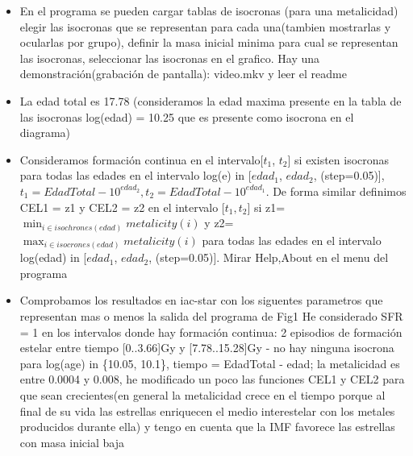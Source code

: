 \documentclass[10pt]{book}
\begin{document}
\begin{itemize}
\item En el programa se pueden cargar tablas de isocronas (para una metalicidad) elegir las isocronas que se representan para cada una(tambien mostrarlas y ocularlas por grupo), definir la masa inicial minima para cual se representan las isocronas, seleccionar las isocronas en el grafico. Hay una demonstración(grabación de pantalla): video.mkv y leer el readme
\item La edad total es 17.78 (consideramos la edad maxima presente en la tabla de las isocronas log(edad) = 10.25 que es presente como isocrona en el diagrama)
\item Consideramos formación continua en el intervalo[$t_1$, $t_2$]  si existen isocronas para todas las edades en el intervalo log(e) in [$edad_1$, $edad_2$,  (step=0.05)], $t_1=EdadTotal - 10^{edad_2}, t_2=EdadTotal - 10^{edad_1}$. De forma similar definimos CEL1 = z1 y CEL2 = z2 en el intervalo [$t_1, t_2$] si z1=$\displaystyle \min_{i \in isochrones(edad)} metalicity(i)$ y z2=$\displaystyle \max_{i \in isocrones(edad)} metalicity(i)$ para todas las edades  en el intervalo log(edad) in [$edad_1$, $edad_2$,  (step=0.05)]. Mirar Help,About en el menu del programa
\item Comprobamos los resultados en iac-star con los siguentes parametros que representan mas o menos la salida del programa de Fig1
He considerado SFR = 1 en los intervalos donde hay formación continua: 2 episodios de formación estelar entre tiempo [0..3.66]Gy y [7.78..15.28]Gy - no hay ninguna isocrona para log(age) in \{10.05, 10.1\}, tiempo = EdadTotal - edad; la metalicidad es entre 0.0004 y 0.008, he modificado un poco las funciones  CEL1 y CEL2 para que sean crecientes(en general la metalicidad crece en el tiempo porque al final de su vida las estrellas enriquecen el medio interestelar con los metales producidos durante ella) y tengo en cuenta que la IMF favorece las estrellas con masa inicial baja




\end{itemize}
\end{document}
